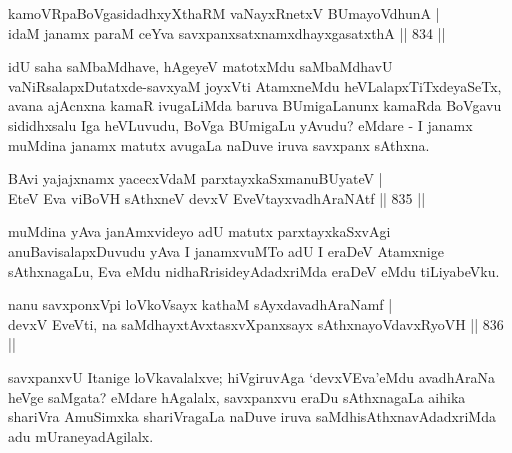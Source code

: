 \begin{shl}
kamoVRpaBoVgasidadhxyXthaRM vaNayxRnetxV BUmayoV\s dhunA | \\
idaM janamx paraM ceYva savxpanxsatxnamxdhayxgasatxthA \hfill||  834 ||  
\end{shl}

\begin{artha}
idU saha saMbaMdhave, hAgeyeV matotxMdu saMbaMdhavU vaNiRsalapxDutatxde-savxyaM joyxVti AtamxneMdu heVLalapxTiTxdeyaSeTx, avana ajAcnxna kamaR ivugaLiMda baruva BUmigaLanunx kamaRda BoVgavu sididhxsalu Iga heVLuvudu, BoVga BUmigaLu yAvudu? eMdare - I janamx muMdina janamx matutx avugaLa naDuve iruva savxpanx sAthxna.
\end{artha}


\begin{shl}
\footnotemark[1]BAvi yajajxnamx yacecxVdaM parxtayxkaSxmanuBUyateV | \\
EteV Eva viBoVH sAthxneV devxV EveVtayxvadhAraNAtf \hfill||  835 ||  
\end{shl}

\begin{artha}
muMdina yAva janAmxvideyo adU matutx parxtayxkaSxvAgi anuBavisalapxDuvudu yAva I janamxvuMTo adU I eraDeV Atamxnige sAthxnagaLu, Eva eMdu nidhaRrisideyAdadxriMda eraDeV eMdu tiLiyabeVku.
\end{artha}


\begin{shl}
nanu savxponxV\s pi loVkoV\s sayx kathaM sAyxdavadhAraNamf | \\
devxV EveVti, na \footnotemark[2]saMdhayxtAvxtasxvXpanxsayx sAthxnayoVdavxRyoVH \hfill||  836 ||  
\end{shl}

\begin{artha}
savxpanxvU Itanige loVkavalalxve; hiVgiruvAga `devxVEva'eMdu avadhAraNa heVge saMgata? eMdare hAgalalx, savxpanxvu eraDu sAthxnagaLa aihika shariVra AmuSimxka shariVragaLa naDuve iruva saMdhisAthxnavAdadxriMda adu mUraneyadAgilalx. 
\end{artha}

